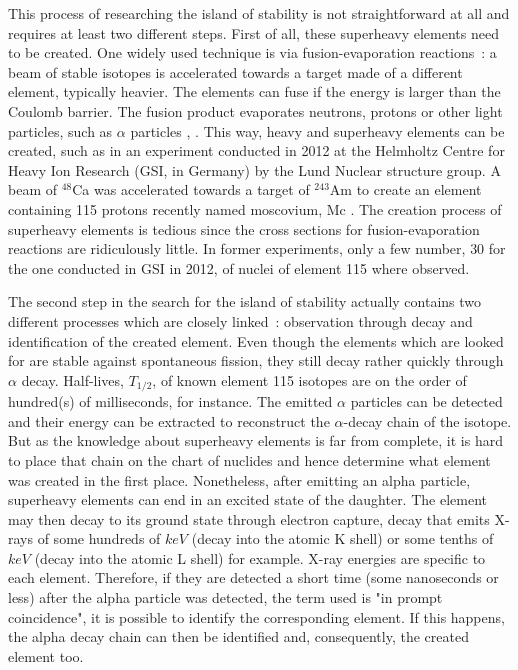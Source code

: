 \documentclass[11pt,a4paper]{article}
\begin{document}
This process of researching the island of stability is not straightforward at all and requires at least two different steps. First of all, these superheavy elements need to be created. One widely used technique is via fusion-evaporation reactions~: a beam of stable isotopes is accelerated towards a target made of a different element, typically heavier. The elements can fuse if the energy is larger than the Coulomb barrier. The fusion product evaporates neutrons, protons or other light particles, such as $\alpha$ particles \cite{Matti}, \cite{Thoen}. This way, heavy and superheavy elements can be created, such as in an experiment conducted in 2012 at the Helmholtz Centre for Heavy Ion Research (GSI, in Germany) by the Lund Nuclear structure group. A beam of $^{48}$Ca was accelerated towards a target of $^{243}$Am to create an element containing 115 protons recently named moscovium, Mc \cite{element115}.
The creation process of superheavy elements is tedious since the cross sections for fusion-evaporation reactions are ridiculously little. In former experiments, only a few number, $30$ for the one conducted in GSI in 2012, of nuclei of element 115 where observed.

The second step in the search for the island of stability actually contains two different processes which are closely linked~: observation through decay and identification of the created element. Even though the elements which are looked for are stable against spontaneous fission, they still decay rather quickly through $\alpha$ decay. Half-lives, $T_{1/2}$, of known element 115 isotopes are on the order of hundred(s) of milliseconds, for instance. The emitted $\alpha$ particles can be detected and their energy can be extracted to reconstruct the $\alpha$-decay chain of the isotope. But as the knowledge about superheavy elements is far from complete, it is hard to place that chain on the chart of nuclides and hence determine what element was created in the first place. Nonetheless, after emitting an alpha particle, superheavy elements can end in an excited state of the daughter. The element may then decay to its ground state through electron capture, decay that emits X-rays of some hundreds of $keV$ (decay into the atomic K shell) or some tenths of $keV$ (decay into the atomic L shell) for example. X-ray energies are specific to each element. Therefore, if they are detected a short time (some nanoseconds or less) after the alpha particle was detected, the term used is "in prompt coincidence", it is possible to identify the corresponding element. If this happens, the alpha decay chain can then be identified and, consequently, the created element too.
\end{document}
